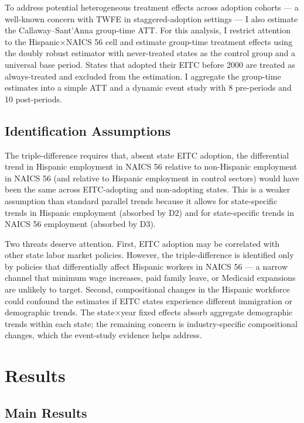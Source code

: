 \documentclass[12pt]{article}
\begin{document}
To address potential heterogeneous treatment effects across adoption cohorts --- a well-known concern with TWFE in staggered-adoption settings \citep{goodman2021difference, sun2021estimating} --- I also estimate the Callaway--Sant'Anna \citeyearpar{callaway2021difference} group-time ATT. For this analysis, I restrict attention to the Hispanic$\times$NAICS 56 cell and estimate group-time treatment effects using the doubly robust estimator with never-treated states as the control group and a universal base period. States that adopted their EITC before 2000 are treated as always-treated and excluded from the estimation. I aggregate the group-time estimates into a simple ATT and a dynamic event study with 8 pre-periods and 10 post-periods.

\subsection{Identification Assumptions}

The triple-difference requires that, absent state EITC adoption, the differential trend in Hispanic employment in NAICS 56 relative to non-Hispanic employment in NAICS 56 (and relative to Hispanic employment in control sectors) would have been the same across EITC-adopting and non-adopting states. This is a weaker assumption than standard parallel trends because it allows for state-specific trends in Hispanic employment (absorbed by D2) and for state-specific trends in NAICS 56 employment (absorbed by D3).

Two threats deserve attention. First, EITC adoption may be correlated with other state labor market policies. However, the triple-difference is identified only by policies that differentially affect Hispanic workers in NAICS 56 --- a narrow channel that minimum wage increases, paid family leave, or Medicaid expansions are unlikely to target. Second, compositional changes in the Hispanic workforce could confound the estimates if EITC states experience different immigration or demographic trends. The state$\times$year fixed effects absorb aggregate demographic trends within each state; the remaining concern is industry-specific compositional changes, which the event-study evidence helps address.

\section{Results}

\subsection{Main Results}
\end{document}

